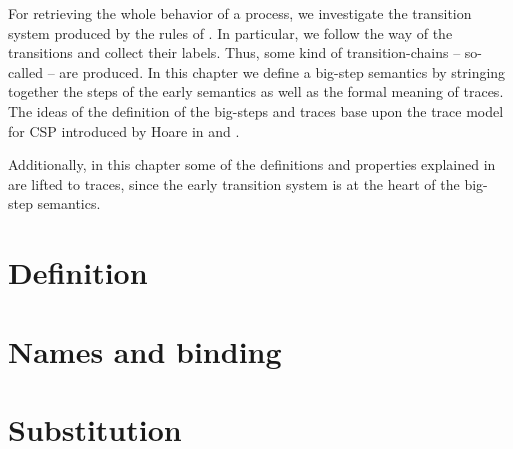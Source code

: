 For retrieving the whole behavior of a process, we investigate the transition system produced by the rules of . In particular, we follow the way of the transitions and collect their labels. Thus, some kind of transition-chains -- so-called  -- are produced. In this chapter we define a big-step semantics by stringing together the steps of the early semantics as well as the formal meaning of traces. The ideas of the definition of the big-steps and traces base upon the trace model for \gls{CSP} introduced by Hoare in \cite{hoareTraceOriginal} and \cite{hoare}.%

Additionally, in this chapter some of the definitions and properties explained in  are lifted to traces, since the early transition system is at the heart of the big-step semantics.

\section{Definition}
\label{sec_big-step_def}


\section{Names and binding}
\label{sec_big-step_name_binding}


\section{Substitution}
\label{sec_big-step_substitution}


